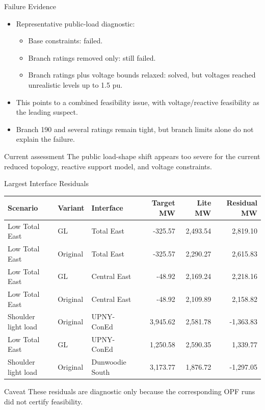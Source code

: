 \documentclass[aspectratio=169,10pt]{beamer}
\begin{document}
\begin{frame}{Failure Evidence}
\begin{itemize}
  \item Representative public-load diagnostic:
    \begin{itemize}
      \item Base constraints: failed.
      \item Branch ratings removed only: still failed.
      \item Branch ratings plus voltage bounds relaxed: solved, but voltages reached unrealistic levels up to 1.5 pu.
    \end{itemize}
  \item This points to a combined feasibility issue, with voltage/reactive feasibility as the leading suspect.
  \item Branch 190 and several ratings remain tight, but branch limits alone do not explain the failure.
\end{itemize}

\vspace{0.7em}
\begin{block}{Current assessment}
The public load-shape shift appears too severe for the current reduced topology, reactive support model, and voltage constraints.
\end{block}
\end{frame}

\begin{frame}{Largest Interface Residuals}
\scriptsize
\begin{tabularx}{\linewidth}{l l l r r r}
\toprule
\textbf{Scenario} & \textbf{Variant} & \textbf{Interface} &
\textbf{Target MW} & \textbf{Lite MW} & \textbf{Residual MW} \\
\midrule
Low Total East & GL & Total East & -325.57 & 2,493.54 & 2,819.10 \\
Low Total East & Original & Total East & -325.57 & 2,290.27 & 2,615.83 \\
Low Total East & GL & Central East & -48.92 & 2,169.24 & 2,218.16 \\
Low Total East & Original & Central East & -48.92 & 2,109.89 & 2,158.82 \\
Shoulder light load & Original & UPNY-ConEd & 3,945.62 & 2,581.78 & -1,363.83 \\
Low Total East & GL & UPNY-ConEd & 1,250.58 & 2,590.35 & 1,339.77 \\
Shoulder light load & Original & Dunwoodie South & 3,173.77 & 1,876.72 & -1,297.05 \\
\bottomrule
\end{tabularx}

\vspace{0.6em}
\begin{alertblock}{Caveat}
These residuals are diagnostic only because the corresponding OPF runs did not certify feasibility.
\end{alertblock}
\end{frame}
\end{document}
